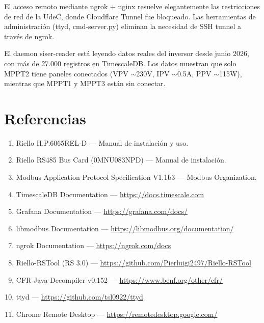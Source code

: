 \documentclass[12pt,a4paper]{article}
\begin{document}
El acceso remoto mediante ngrok + nginx resuelve elegantemente las restricciones de red de la UdeC, donde Cloudflare Tunnel fue bloqueado. Las herramientas de administraci\'on (ttyd, cmd-server.py) eliminan la necesidad de SSH tunnel a trav\'es de ngrok.

El daemon siser-reader est\'a leyendo datos reales del inversor desde junio 2026, con m\'as de 27.000 registros en TimescaleDB. Los datos muestran que solo MPPT2 tiene paneles conectados (VPV $\sim$230V, IPV $\sim$0.5A, PPV $\sim$115W), mientras que MPPT1 y MPPT3 est\'an sin conectar.

\section{Referencias}

\begin{enumerate}
    \item Riello H.P.6065REL-D --- Manual de instalaci\'on y uso.
    \item Riello RS485 Bus Card (0MNU083NPD) --- Manual de instalaci\'on.
    \item Modbus Application Protocol Specification V1.1b3 --- Modbus Organization.
    \item TimescaleDB Documentation --- \url{https://docs.timescale.com}
    \item Grafana Documentation --- \url{https://grafana.com/docs/}
    \item libmodbus Documentation --- \url{https://libmodbus.org/documentation/}
    \item ngrok Documentation --- \url{https://ngrok.com/docs}
    \item Riello-RSTool (RS 3.0) --- \url{https://github.com/Pierluigi2497/Riello-RSTool}
    \item CFR Java Decompiler v0.152 --- \url{https://www.benf.org/other/cfr/}
    \item ttyd --- \url{https://github.com/tsl0922/ttyd}
    \item Chrome Remote Desktop --- \url{https://remotedesktop.google.com/}
\end{enumerate}
\end{document}

